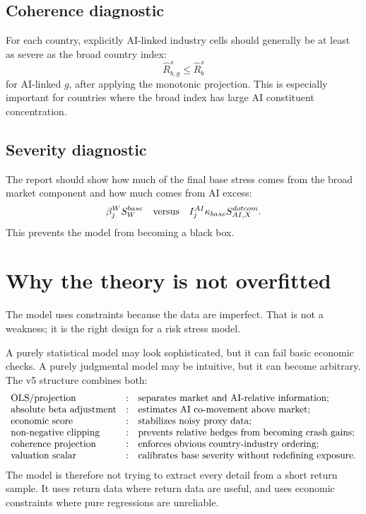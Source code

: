 \documentclass[11pt]{article}
\begin{document}
\subsection{Coherence diagnostic}

For each country, explicitly AI-linked industry cells should generally be at least as severe as the broad country index:
\[
\widehat R_{b,g}^s\leq \widehat R_b^s
\]
for AI-linked $g$, after applying the monotonic projection. This is especially important for countries where the broad index has large AI constituent concentration.

\subsection{Severity diagnostic}

The report should show how much of the final base stress comes from the broad market component and how much comes from AI excess:
\[
\beta_j^W S_W^{base}
\quad \hbox{versus} \quad
I_j^{AI}\kappa_{base}S_{AI,X}^{dotcom}.
\]
This prevents the model from becoming a black box.

\section{Why the theory is not overfitted}

The model uses constraints because the data are imperfect. That is not a weakness; it is the right design for a risk stress model.

A purely statistical model may look sophisticated, but it can fail basic economic checks. A purely judgmental model may be intuitive, but it can become arbitrary. The v5 structure combines both:
\[
\begin{array}{lll}
\hbox{OLS/projection} &:& \hbox{separates market and AI-relative information;}\\
\hbox{absolute beta adjustment} &:& \hbox{estimates AI co-movement above market;}\\
\hbox{economic score} &:& \hbox{stabilizes noisy proxy data;}\\
\hbox{non-negative clipping} &:& \hbox{prevents relative hedges from becoming crash gains;}\\
\hbox{coherence projection} &:& \hbox{enforces obvious country-industry ordering;}\\
\hbox{valuation scalar} &:& \hbox{calibrates base severity without redefining exposure.}
\end{array}
\]
The model is therefore not trying to extract every detail from a short return sample. It uses return data where return data are useful, and uses economic constraints where pure regressions are unreliable.
\end{document}
